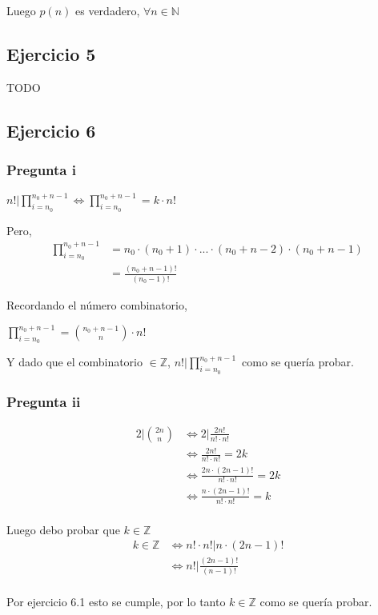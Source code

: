 Luego $p(n)$ es verdadero, $ \forall n \in \mathbb{N} $

\subsection{Ejercicio 5}
TODO

\subsection{Ejercicio 6}
\subsubsection{Pregunta i}
$ n! | \prod_{i = n_0}^{n_0 + n - 1} \iff \prod_{i = n_0}^{n_0 + n - 1} = k\cdot n!$

Pero,
\begin{align*}
    \prod_{i = n_0}^{n_0 + n - 1} &= n_0 \cdot (n_0 +1) \cdot ... \cdot (n_0 + n - 2) \cdot (n_0 + n -1) \\
    &= \frac{(n_0+n-1)!}{(n_0-1)!}
\end{align*}

Recordando el número combinatorio, 

$ \prod_{i = n_0}^{n_0 + n - 1} = \binom{n_0+n-1}{n} \cdot n! $

Y dado que el combinatorio $ \in \mathbb{Z} $, $ n! | \prod_{i = n_0}^{n_0 + n - 1} $ como se quería probar.

\subsubsection{Pregunta ii}
\begin{align*}
    2 | \binom{2n}{n} &\iff 2|\frac{2n!}{n!\cdot n!} \\
    &\iff \frac{2n!}{n!\cdot n!} = 2k \\
    &\iff \frac{2n \cdot (2n-1)!}{n!\cdot n!} = 2k \\
    &\iff \frac{n \cdot (2n-1)!}{n!\cdot n!} = k \\
\end{align*}

Luego debo probar que $k \in \mathbb{Z}$
\begin{align*}
    k \in \mathbb{Z} &\iff n!\cdot n! | n \cdot (2n-1)! \\
    &\iff n! | \frac{(2n-1)!}{(n-1)!} \\
\end{align*}

Por ejercicio 6.1 esto se cumple, por lo tanto $ k \in \mathbb{Z} $ como se quería probar.

